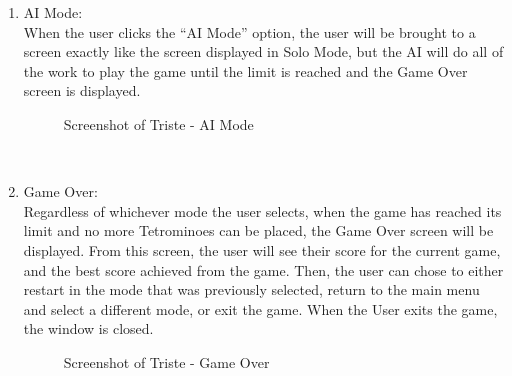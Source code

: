 \documentclass[conference]{IEEEtran}
\begin{document}
\begin{enumerate}
\item AI Mode: \\
When the user clicks the “AI Mode” option, the user will be brought to a screen exactly like the screen displayed in Solo Mode, but the AI will do all of the work to play the game until the limit is reached and the Game Over screen is displayed.
\begin{figure}[htbp]
\centering
    \caption{Screenshot of Triste - AI Mode}
    \label{fig:Display}
\end{figure} \\

\item Game Over: \\
Regardless of whichever mode the user selects, when the game has reached its limit and no more Tetrominoes can be placed, the Game Over screen will be displayed. From this screen, the user will see their score for the current game, and the best score achieved from the game. Then, the user can chose to either restart in the mode that was previously selected, return to the main menu and select a different mode, or exit the game. When the User exits the game, the window is closed.
\begin{figure}[htbp]
\centering
    \caption{Screenshot of Triste - Game Over}
    \label{fig:Display}
\end{figure} \\
\end{enumerate}
\end{document}
